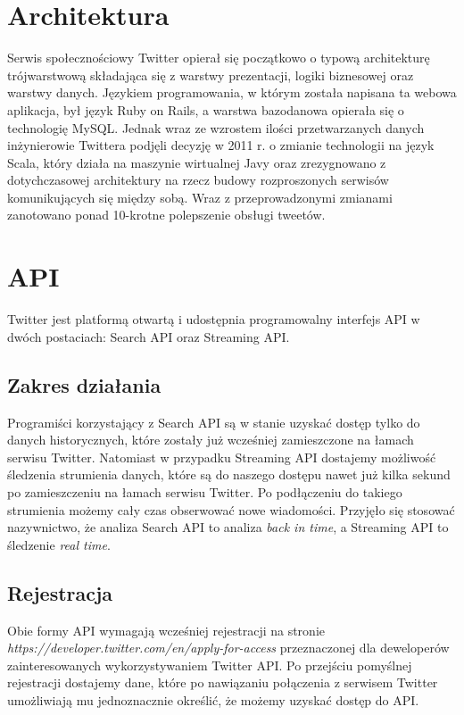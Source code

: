 \section{Architektura}
Serwis społecznościowy Twitter opierał się początkowo o typową architekturę trójwarstwową składająca się z warstwy prezentacji, logiki biznesowej oraz warstwy danych. Językiem programowania, w którym została napisana ta webowa aplikacja, był język Ruby on Rails, a warstwa bazodanowa opierała się o technologię MySQL. Jednak wraz ze wzrostem ilości przetwarzanych danych inżynierowie Twittera podjęli decyzję w 2011 r. o zmianie technologii na język Scala, który działa na maszynie wirtualnej Javy oraz zrezygnowano z dotychczasowej architektury na rzecz budowy rozproszonych serwisów komunikujących się między sobą. Wraz z przeprowadzonymi zmianami zanotowano ponad 10-krotne polepszenie obsługi tweetów.

\section{API}
Twitter jest platformą otwartą i udostępnia programowalny interfejs API w dwóch postaciach: Search API oraz Streaming API.

\subsection{Zakres działania}
Programiści korzystający z Search API są w stanie uzyskać dostęp tylko do danych historycznych, które zostały już wcześniej zamieszczone na łamach serwisu Twitter. Natomiast w przypadku Streaming API dostajemy możliwość śledzenia strumienia danych, które są do naszego dostępu nawet już kilka sekund po zamieszczeniu na łamach serwisu Twitter. Po podłączeniu do takiego strumienia możemy cały czas obserwować nowe wiadomości. Przyjęło się stosować nazywnictwo, że analiza Search API to analiza \textit{back in time}, a Streaming API to śledzenie \textit{real time}.

\subsection{Rejestracja}
Obie formy API wymagają wcześniej rejestracji na stronie \textit{https://developer.twitter.com/en/apply-for-access} przeznaczonej dla deweloperów zainteresowanych wykorzystywaniem Twitter API. Po przejściu pomyślnej rejestracji dostajemy dane, które po nawiązaniu połączenia z serwisem Twitter umożliwiają mu jednoznacznie określić, że możemy uzyskać dostęp do API.

